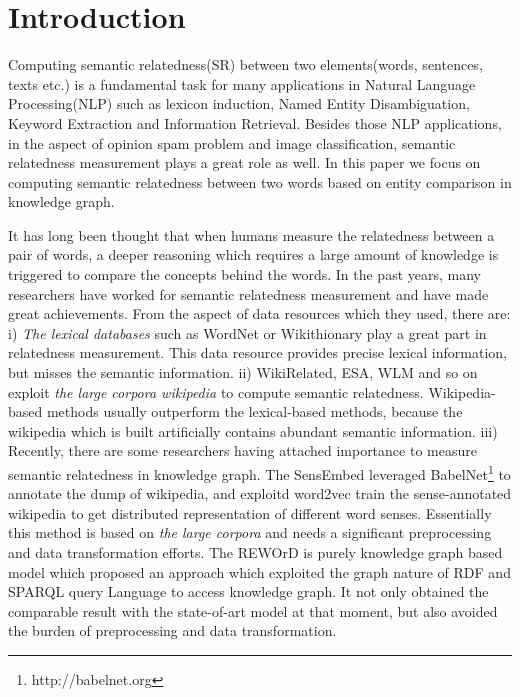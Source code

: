 \section{Introduction}
Computing semantic relatedness(SR) between two elements(words, sentences,
texts etc.) is a fundamental task for many applications in Natural Language
Processing(NLP) such as lexicon induction\cite{aaai/QadirMGL15}, Named 
Entity Disambiguation\cite{acl/HanZ10}, Keyword Extraction
\cite{ijcai/ZhangFW13} and Information Retrieval\cite{acl/GurevychMZ07}. 
Besides those NLP applications, in the aspect of opinion spam problem\cite{www/SandulescuE15}
and image classification\cite{iwcs/LeongM11}, semantic relatedness measurement plays a great role as well. 
In this paper we focus on computing semantic relatedness between two words based on entity comparison in knowledge graph.

It has long been thought that when humans measure the relatedness between a pair of words,
a deeper reasoning which requires a large amount of knowledge is triggered to compare the concepts behind the words.
In the past years, many researchers have worked for semantic relatedness measurement and have made great achievements.
From the aspect of data resources which they used, there are:
i) \emph{The lexical databases} such as WordNet\cite{acl/Pucher07} or Wikithionary\cite{aaai/ZeschMG08} play a great part in
relatedness measurement. This data resource provides precise lexical information, but misses the semantic information.
ii) WikiRelated\cite{aaai/StrubeP06}, ESA\cite{ijcai/GabrilovichM07}, WLM\cite{aaai/ZeschMG08} and so on exploit \emph{the large corpora wikipedia}
to compute semantic relatedness. Wikipedia-based methods usually outperform the lexical-based methods, 
because the wikipedia which is built artificially contains abundant semantic information. 
iii) Recently, there are some researchers having attached importance to measure semantic relatedness
in knowledge graph. 
The SensEmbed \cite{acl/IacobacciPN15} leveraged BabelNet\footnote{http://babelnet.org} to annotate the dump of wikipedia,
and exploitd word2vec\cite{corr/Mikolov13} train the sense-annotated wikipedia to get distributed representation of different 
word senses. Essentially this method is based on \emph{the large corpora} and needs a significant preprocessing
and data transformation efforts. 
The REWOrD \cite{aaai/Pirro12} is purely knowledge graph based model which proposed an approach which exploited 
the graph nature of RDF and SPARQL query Language to access knowledge graph. It not only obtained the comparable
result with the state-of-art model at that moment, but also avoided the burden of preprocessing and data transformation.

